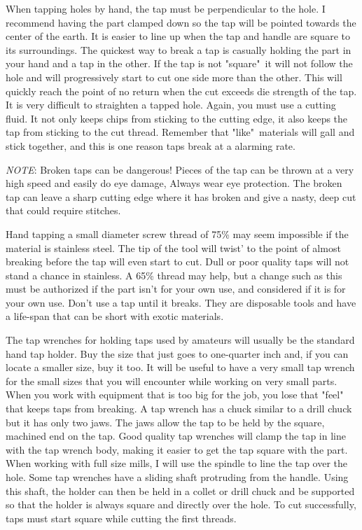 
When tapping holes by hand, the tap must be perpendicular to the hole. I
recommend having the part clamped down so the tap will be pointed towards the
center of the earth. It is easier to line up when the tap and handle are square
to its surroundings. The quickest way to break a tap is casually holding the
part in your hand and a tap in the other. If the tap is not "square"\ it will
not follow the hole and will progressively start to cut one side more than the
other. This will quickly reach the point of no return when the cut exceeds die
strength of the tap. It is very difficult to straighten a tapped hole. Again,
you must use a cutting fluid. It not only keeps chips from sticking to the
cutting edge, it also keeps the tap from sticking to the cut thread. Remember
that "like"\ materials will gall and stick together, and this is one reason taps
break at a alarming rate.

\emph{NOTE}: Broken taps can be dangerous! Pieces of the tap can be thrown at a
very high speed and easily do eye damage, Always wear eye protection. The broken
tap can leave a sharp cutting edge where it has broken and give a nasty, deep
cut that could require stitches.


Hand tapping a small diameter screw thread of 75\% may seem impossible if the
material is stainless steel. The tip of the tool will twist' to the point of
almost breaking before the tap will even start to cut. Dull or poor quality taps
will not stand a chance in stainless. A 65\% thread may help, but a change such
as this must be authorized if the part isn't for your own use, and considered if
it is for your own use. Don't use a tap until it breaks. They are disposable
tools and have a life-span that can be short with exotic materials.


The tap wrenches for holding taps used by amateurs will usually be the standard
hand tap holder. Buy the size that just goes to one-quarter inch and, if you can
locate a smaller size, buy it too. It will be useful to have a very small tap
wrench for the small sizes that you will encounter while working on very small
parts. When you work with equipment that is too big for the job, you lose that
"feel" that keeps taps from breaking. A tap wrench has a chuck similar to a
drill chuck but it has only two jaws. The jaws allow the tap to be held by the
square, machined end on the tap. Good quality tap wrenches will clamp the tap in
line with the tap wrench body, making it easier to get the tap square with the
part. When working with full size mills, I will use the spindle to line the tap
over the hole. Some tap wrenches have a sliding shaft protruding from the
handle. Using this shaft, the holder can then be held in a collet or drill chuck
and be supported so that the holder is always square and directly over the hole.
To cut successfully, taps must start square while cutting the first threads.

